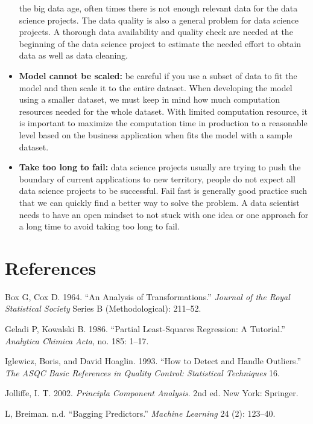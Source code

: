 \documentclass[
]{article}
\begin{document}
\begin{itemize}
  the big data age, often times there is not enough relevant data for
  the data science projects. The data quality is also a general problem
  for data science projects. A thorough data availability and quality
  check are needed at the beginning of the data science project to
  estimate the needed effort to obtain data as well as data cleaning.
\item
  \textbf{Model cannot be scaled:} be careful if you use a subset of
  data to fit the model and then scale it to the entire dataset. When
  developing the model using a smaller dataset, we must keep in mind how
  much computation resources needed for the whole dataset. With limited
  computation resource, it is important to maximize the computation time
  in production to a reasonable level based on the business application
  when fits the model with a sample dataset.
\item
  \textbf{Take too long to fail:} data science projects usually are
  trying to push the boundary of current applications to new territory,
  people do not expect all data science projects to be successful. Fail
  fast is generally good practice such that we can quickly find a better
  way to solve the problem. A data scientist needs to have an open
  mindset to not stuck with one idea or one approach for a long time to
  avoid taking too long to fail.
\end{itemize}

\hypertarget{references}{%
\section{References}\label{references}}

\hypertarget{refs}{}
\leavevmode\hypertarget{ref-BOXCOX1}{}%
Box G, Cox D. 1964. ``An Analysis of Transformations.'' \emph{Journal of
the Royal Statistical Society} Series B (Methodological): 211--52.

\leavevmode\hypertarget{ref-PLS1}{}%
Geladi P, Kowalski B. 1986. ``Partial Least-Squares Regression: A
Tutorial.'' \emph{Analytica Chimica Acta}, no. 185: 1--17.

\leavevmode\hypertarget{ref-mad1}{}%
Iglewicz, Boris, and David Hoaglin. 1993. ``How to Detect and Handle
Outliers.'' \emph{The ASQC Basic References in Quality Control:
Statistical Techniques} 16.

\leavevmode\hypertarget{ref-pca1}{}%
Jolliffe, I. T. 2002. \emph{Principla Component Analysis}. 2nd ed. New
York: Springer.

\leavevmode\hypertarget{ref-bag1}{}%
L, Breiman. n.d. ``Bagging Predictors.'' \emph{Machine Learning} 24 (2):
123--40.
\end{document}
